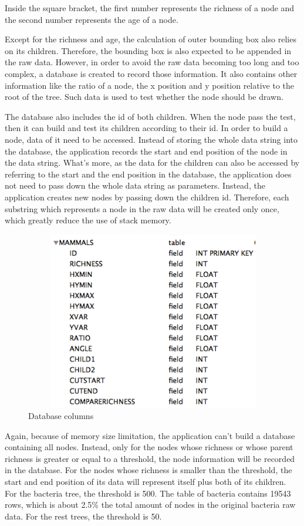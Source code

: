 \documentclass[MSc]{icldt}
\begin{document}
Inside the square bracket, the first number represents the richness of a node and the second number represents the age of a node.

Except for the richness and age, the calculation of outer bounding box also relies on its children. Therefore, the bounding box is also expected to be appended in the raw data. However, in order to avoid the raw data becoming too long and too complex, a database is created to record those information. It also contains other information like the ratio of a node, the x position and y position relative to the root of the tree. Such data is used to test whether the node should be drawn. 

The database also includes the id of both children. When the node pass the test, then it can build and test its children according to their id. In order to build a node, data of it need to be accessed. Instead of storing the whole data string into the database, the application records the start and end position of the node in the data string. What's more, as the data for the children can also be accessed by referring to the start and the end position in the database, the application does not need to pass down the whole data string as parameters. Instead, the application creates new nodes by passing down the children id. Therefore, each substring which represents a node in the raw data will be created only once, which greatly reduce the use of stack memory. 

\begin{figure}[H]
  \centering
  \includegraphics [width=15cm,height=7.8cm]{Database}
  \caption{Database columns}
  \label{fig:mammal}
\end{figure}

Again, because of memory size limitation, the application can't build a database containing all nodes. Instead, only for the nodes whose richness or whose parent richness is greater or equal to a threshold, the node information will be recorded in the database. For the nodes whose richness is smaller than the threshold, the start and end position of its data will represent itself plus both of its children. For the bacteria tree, the threshold is 500. The table of bacteria contains  19543 rows, which is about 2.5\% the total amount of nodes in the original bacteria raw data. For the rest trees, the threshold is 50.
\end{document}
